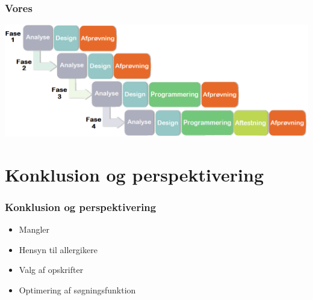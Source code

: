 \begin{frame}
	\begin{center}
	\frametitle{Vores}	
	\includegraphics[scale=0.25]{../report/billeder/blandingsmetode.png}
	\end{center}
\end{frame}


\section{Konklusion og perspektivering}

\begin{frame}
	\frametitle{Konklusion og perspektivering}
	\begin{itemize}
		\item Mangler
		\item Hensyn til allergikere
		\item Valg af opskrifter
		\item Optimering af søgningsfunktion
	\end{itemize}
\end{frame}
